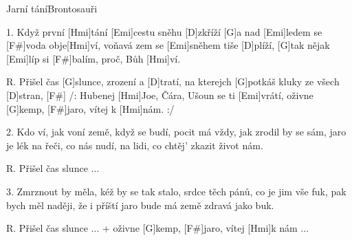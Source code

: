 \begin{song}{Jarní tání}{Brontosauři}

\begin{xverse}{1. }
Když první [Hmi]tání [Emi]cestu sněhu [D]zkříží
[G]a nad [Emi]ledem se [F#]voda obje[Hmi]ví,
voňavá zem se [Emi]sněhem tiše [D]plíží,
[G]tak nějak [Emi]líp si [F#]balím, proč, Bůh [Hmi]ví.
\end{xverse}

\begin{xverse}{R. }
Přišel čas [G]slunce, zrození a [D]tratí,
na kterejch [G]potkáš kluky ze všech [D]stran, [F#]{}
/: Hubenej [Hmi]Joe, Čára, Ušoun se ti [Emi]vrátí,
oživne [G]kemp, [F#]jaro, vítej k [Hmi]nám. :/
\end{xverse}

\begin{xverse}{2. }
Kdo ví, jak voní země, když se budí,
pocit má vždy, jak zrodil by se sám,
jaro je lék na řeči, co nás nudí,
na lidi, co chtěj' zkazit život nám.
\end{xverse}

\begin{xverse}{R. }
Přišel čas slunce ...
\end{xverse}

\begin{xverse}{3. }
Zmrznout by měla, kéž by se tak stalo,
srdce těch pánů, co je jim vše fuk,
pak bych měl naději, že i příští jaro
bude má země zdravá jako buk.
\end{xverse}

\begin{xverse}{R. }
Přišel čas slunce ...
+ oživne [G]kemp, [F#]jaro, vítej [Hmi]k nám ...
\end{xverse}

\end{song}

